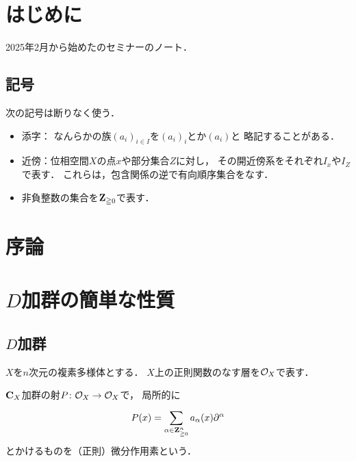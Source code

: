 






\maketitle
\chapter*{はじめに}
2025年2月から始めた\cite{Kas08}のセミナーのノート．

\section*{記号}
次の記号は断りなく使う．
\begin{itemize}
    \item 添字：
    なんらかの族$(a_i)_{i\in I}$を$(a_i)_i$とか$(a_i)$と
    略記することがある．
    \item 近傍：位相空間\(X\)の点\(x\)や部分集合\(Z\)に対し，
    その開近傍系をそれぞれ\(I_x\)や\(I_Z\)で表す．
    これらは，包含関係の逆で有向順序集合をなす．
    \item 非負整数の集合を\(\mathbf{Z}_{\geqq0}\)で表す．
\end{itemize}
\tableofcontents
\chapter*{序論}

\chapter{\(D\)加群の簡単な性質}\label{chap1}
\section{\(D\)加群}\label{sec11}
\(X\)を\(n\)次元の複素多様体とする．
\(X\)上の正則関数のなす層を\(\mathcal{O}_X\)で表す．

\(\mathbf{C}_X\)加群の射\(P\colon\mathcal{O}_X\to\mathcal{O}_X\)で，
局所的に\[
    P(x)=\sum_{\alpha\in\mathbf{Z}_{\geqq0}^{n}}^{}
    a_{\alpha}(x)\partial^{\alpha}
\]とかけるものを（正則）微分作用素という．

